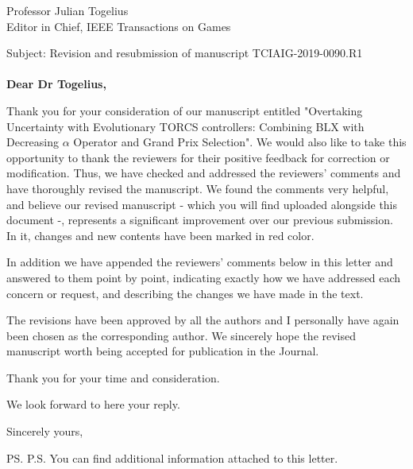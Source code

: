 \documentclass[10pt]{letter} %
\begin{document}

\begin{letter}{Professor Julian Togelius \\ Editor in Chief, IEEE Transactions on Games} %

\opening{Subject: Revision and resubmission of manuscript TCIAIG-2019-0090.R1\\
	\\	
\textbf{Dear Dr Togelius,}}

Thank you for your consideration of our manuscript entitled "Overtaking Uncertainty with Evolutionary TORCS controllers: Combining BLX with Decreasing $\alpha$ Operator and Grand Prix Selection". 
We would also like to take this opportunity to thank the reviewers for their positive feedback for correction or modification. Thus, we have checked and addressed the reviewers' comments and have thoroughly revised the manuscript. We found the comments very helpful, and believe our revised manuscript - which you will find uploaded alongside this document -, represents a significant improvement over our previous submission. In it, changes and new contents have been marked in red color.

In addition we have appended the reviewers' comments below in this letter and answered to them point by point, indicating exactly how we have addressed each concern or request, and describing the changes we have made in the text. 

The revisions have been approved by all the authors and I personally have again been chosen as the corresponding author. 
We sincerely hope the revised manuscript worth being accepted for publication in the Journal.

Thank you for your time and consideration.

We look forward to here your reply.

\vspace{2\parskip} %
\closing{Sincerely yours,}
\vspace{2\parskip} %

\ps{P.S. You can find additional information attached to this letter.} %








\end{letter}
\end{document}
